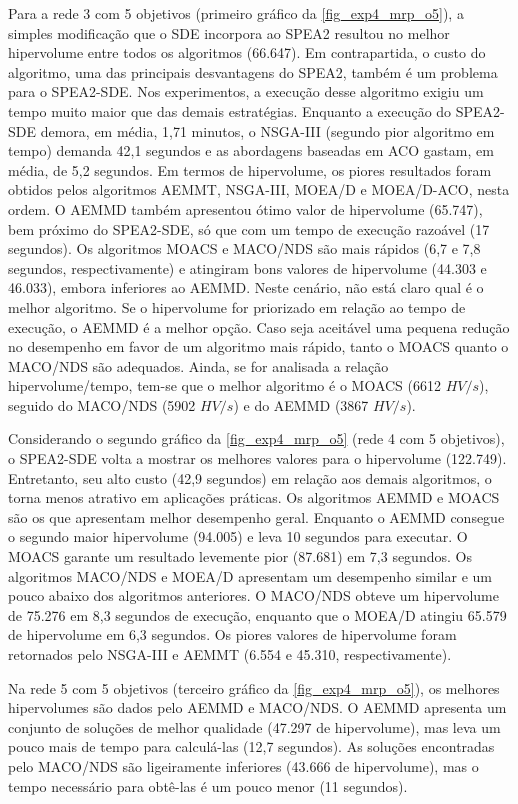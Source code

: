 Para a rede 3 com 5 objetivos (primeiro gráfico da \autoref{fig_exp4_mrp_o5}), a simples modificação que o SDE incorpora ao SPEA2 resultou no melhor hipervolume entre todos os algoritmos (66.647). Em contrapartida, o custo do algoritmo, uma das principais desvantagens do SPEA2, também é um problema para o SPEA2-SDE. Nos experimentos, a execução desse algoritmo exigiu um tempo muito maior que das demais estratégias. Enquanto a execução do SPEA2-SDE demora, em média, 1,71 minutos, o NSGA-III (segundo pior algoritmo em tempo) demanda 42,1 segundos e as abordagens baseadas em ACO gastam, em média, de 5,2 segundos. Em termos de hipervolume, os piores resultados foram obtidos pelos algoritmos AEMMT, NSGA-III, MOEA/D e MOEA/D-ACO, nesta ordem. O AEMMD também apresentou ótimo valor de hipervolume (65.747), bem próximo do SPEA2-SDE, só que com um tempo de execução razoável (17 segundos). Os algoritmos MOACS e MACO/NDS são mais rápidos (6,7 e 7,8 segundos, respectivamente) e atingiram bons valores de hipervolume (44.303 e 46.033), embora inferiores ao AEMMD. Neste cenário, não está claro qual é o melhor algoritmo. Se o hipervolume for priorizado em relação ao tempo de execução, o AEMMD é a melhor opção. Caso seja aceitável uma pequena redução no desempenho em favor de um algoritmo mais rápido, tanto o MOACS quanto o MACO/NDS são adequados. Ainda, se for analisada a relação hipervolume/tempo, tem-se que o melhor algoritmo é o MOACS (6612 $HV/s$), seguido do MACO/NDS (5902 $HV/s$) e do AEMMD (3867 $HV/s$).

Considerando o segundo gráfico da \autoref{fig_exp4_mrp_o5} (rede 4 com 5 objetivos), o SPEA2-SDE volta a mostrar os melhores valores para o hipervolume (122.749). Entretanto, seu alto custo (42,9 segundos) em relação aos demais algoritmos, o torna menos atrativo em aplicações práticas. Os algoritmos AEMMD e MOACS são os que apresentam melhor desempenho geral. Enquanto o AEMMD consegue o segundo maior hipervolume (94.005) e leva 10 segundos para executar. O MOACS garante um resultado levemente pior (87.681) em 7,3 segundos. Os algoritmos MACO/NDS e MOEA/D apresentam um desempenho similar e um pouco abaixo dos algoritmos anteriores. O MACO/NDS obteve um hipervolume de 75.276 em 8,3 segundos de execução, enquanto que o MOEA/D atingiu 65.579 de hipervolume em 6,3 segundos. Os piores valores de hipervolume foram retornados pelo NSGA-III e AEMMT (6.554 e 45.310, respectivamente).

Na rede 5 com 5 objetivos (terceiro gráfico da \autoref{fig_exp4_mrp_o5}), os melhores hipervolumes são dados pelo AEMMD e MACO/NDS. O AEMMD apresenta um conjunto de soluções de melhor qualidade (47.297 de hipervolume), mas leva um pouco mais de tempo para calculá-las (12,7 segundos). As soluções encontradas pelo MACO/NDS são ligeiramente inferiores (43.666 de hipervolume), mas o tempo necessário para obtê-las é um pouco menor (11 segundos).

